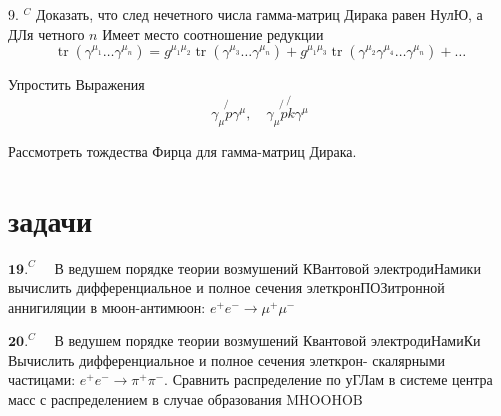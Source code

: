 \documentclass[a4paper,12pt]{article} %
\begin{document}
\begin{task}

9. $^{C}$ Доказать, что след нечетного числа гамма-матриц Дирака равен НулЮ, а ДЛя четного $n$ Имеет место соотношение редукции
$$
\operatorname{tr}\left(\gamma^{\mu_{1}} \ldots \gamma^{\mu_{n}}\right)=g^{\mu_{1} \mu_{2}} \operatorname{tr}\left(\gamma^{\mu_{3}} \ldots \gamma^{\mu_{n}}\right)+g^{\mu_{1} \mu_{3}} \operatorname{tr}\left(\gamma^{\mu_{2}} \gamma^{\mu_{4}} \ldots \gamma^{\mu_{n}}\right)+\ldots
$$


\end{task}



\begin{task}

Упростить Выражения
$$
\gamma_{\mu} \not{p} \gamma^{\mu}, \quad \gamma_{\mu} \not{p} \not{k} \gamma^{\mu}
$$


\end{task}



\begin{task}

Рассмотреть тождества Фирца для гамма-матриц Дирака.


\end{task}


\section{задачи}


\begin{ttask}

$\mathbf{1 9 .}^{C} \quad$ В ведушем порядке теории возмушений КВантовой электродиНамики вычислить дифференциальное и полное сечения элеткронПОЗитронной аннигиляции в мюон-антимюон: $e^{+} e^{-} \rightarrow \mu^{+} \mu^{-}$


\end{ttask}



\begin{ttask}

$\mathbf{2 0 .}^{C} \quad$ В ведушем порядке теории возмушений Квантовой электродиНамиКи Вычислить дифференциальное и полное сечения элеткрон-
скалярными частицами: $e^{+} e^{-} \rightarrow \pi^{+} \pi^{-} .$ Сравнить распределение по уГЛам в системе центра масс с распределением в случае образования
$\mathrm{M} \mathrm{HOOHOB}$


\end{ttask}
\end{document}

